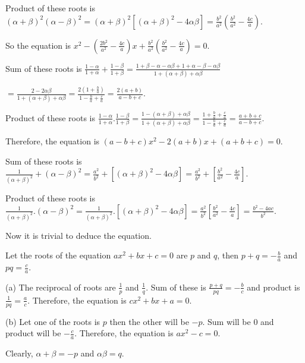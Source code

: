     Product of these roots is $(\alpha + \beta)^2(\alpha - \beta)^2 = (\alpha + \beta)^2[(\alpha +
      \beta)^2 - 4\alpha\beta] = \frac{b^2}{a^2}\left(\frac{b^2}{a^2} - \frac{4c}{a}\right)$.

    So the equation is $x^2 -\left(\frac{2b^2}{a^2} - \frac{4c}{a}\right)x +
    \frac{b^2}{a^2}\left(\frac{b^2}{a^2} - \frac{4c}{a}\right) = 0$.
  \item Sum of these roots is $\frac{1 - \alpha}{1 + \alpha} + \frac{1 - \beta}{1 + \beta} = \frac{1 +
    \beta - \alpha -\alpha\beta + 1 + \alpha - \beta -\alpha\beta}{1 + (\alpha + \beta) + \alpha\beta}$

    $= \frac{2 - 2\alpha\beta}{1 + (\alpha + \beta) + \alpha\beta} = \frac{2\left(1 +
    \frac{b}{a}\right)}{1 - \frac{b}{a} + \frac{c}{a}} = \frac{2(a + b)}{a - b + c}$.

    Product of these roots is $\frac{1 - \alpha}{1 + \alpha}.\frac{1 - \beta}{1 + \beta} = \frac{1
      -(\alpha + \beta) + \alpha\beta}{1 + (\alpha + \beta) + \alpha\beta} = \frac{1 + \frac{b}{a} +
      \frac{c}{a}}{1 - \frac{b}{a} + \frac{c}{a}} = \frac{a + b + c}{a - b + c}$.

    Therefore, the equation is $(a - b + c)x^2 - 2(a + b)x + (a + b + c) = 0$.
  \item Sum of these roots is $\frac{1}{(\alpha + \beta)^2} + (\alpha - \beta)^2 = \frac{a^2}{b^2} +
    [(\alpha + \beta)^2 - 4\alpha\beta] = \frac{a^2}{b^2} + \left[\frac{b^2}{a^2} - \frac{4c}{a}\right]$.

    Product of these roots is $\frac{1}{(\alpha + \beta)^2}.(\alpha - \beta)^2 = \frac{1}{(\alpha +
      \beta)^2}.[(\alpha + \beta)^2 - 4\alpha\beta] = \frac{a^2}{b^2}\left[\frac{b^2}{a^2} -
      \frac{4c}{a}\right] = \frac{b^2 - 4ac}{b^2}$.

    Now it is trivial to deduce the equation.
  \stopitemize
\item Let the roots of the equation $ax^2 + bx + c = 0$ are $p$ and $q$, then $p + q = -\frac{b}{a}$ and $pq
  = \frac{c}{a}$.

  (a) The reciprocal of roots are $\frac{1}{p}$ and $\frac{1}{q}$. Sum of these is $\frac{p + q}{pq} =
  -\frac{b}{c}$ and product is $\frac{1}{pq} = \frac{a}{c}$. Therefore, the equation is $cx^2 + bx + a = 0$.

  (b) Let one of the roots is $p$ then the other will be $-p$. Sum will be $0$ and product will be
  $-\frac{c}{a}$. Therefore, the equation is $ax^2 - c = 0$.
\item Clearly, $\alpha + \beta = -p$ and $\alpha\beta = q$.

